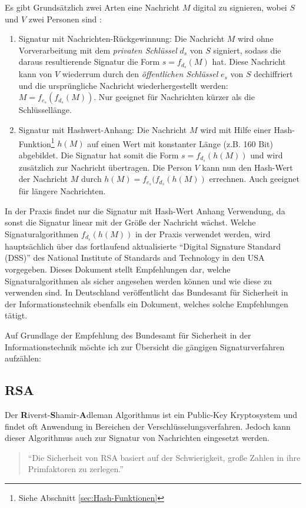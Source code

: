 \documentclass[11pt,a4paper,ngerman]{report}
\begin{document}
Es gibt Grundsätzlich zwei Arten eine Nachricht $M$ digital zu signieren, wobei $S$ und $V$ zwei Personen sind \cite[S. 28-29]{kryptSec11}:
\begin{enumerate}
    \item Signatur mit Nachrichten-Rückgewinnung: Die Nachricht $M$ wird ohne Vorverarbeitung mit dem \textit{privaten Schlüssel} $d_s$ von $S$ signiert, sodass die daraus resultierende Signatur die Form $s = f_{d_s}(M)$ hat. Diese Nachricht kann von $V$ wiederrum durch den \textit{öffentlichen Schlüssel} $e_s$ von $S$ dechiffriert und die ursprüngliche Nachricht wiederhergestellt werden: $M = f_{e_s}(f_{d_s}(M))$. Nur geeignet für Nachrichten kürzer als die Schlüssellänge.
    \item Signatur mit Hashwert-Anhang: Die Nachricht $M$ wird mit Hilfe einer Hash-Funktion\footnote{Siehe Abschnitt \ref{sec:Hash-Funktionen}} $h(M)$ auf einen Wert mit konstanter Länge (z.B. 160 Bit) abgebildet. Die Signatur hat somit die Form $s = f_{d_s}(h(M))$ und wird zusätzlich zur Nachricht übertragen. Die Person $V$ kann nun den Hash-Wert der Nachricht $M$ durch $h(M) = f_{e_s}(f_{d_s}(h(M))$ errechnen. Auch geeignet für längere Nachrichten.
\end{enumerate}
In der Praxis findet nur die Signatur mit Hash-Wert Anhang Verwendung, da sonst die Signatur linear mit der Größe der Nachricht wächst. Welche Signaturalgorithmen $f_{d_s}(h(M))$ in der Praxis verwendet werden, wird hauptsächlich über das fortlaufend aktualisierte ``Digital Signature Standard (DSS)'' des National Institute of Standards and Technology in den USA vorgegeben. Dieses Dokument stellt Empfehlungen dar, welche Signaturalgorithmen als sicher angesehen werden können und wie diese zu verwenden sind. In Deutschland veröffentlicht das Bundesamt für Sicherheit in der Informationstechnik ebenfalls ein Dokument, welches solche Empfehlungen tätigt.

Auf Grundlage der Empfehlung des Bundesamt für Sicherheit in der Informationstechnik \cite[Kapitel 5.4]{bsi-tr-02102-1} möchte ich zur Übersicht die gängigen Signaturverfahren aufzählen:
\subsection{RSA}
Der \textbf{R}iverst-\textbf{S}hamir-\textbf{A}dleman Algorithmus ist ein Public-Key Kryptosystem und findet oft Anwendung in Bereichen der Verschlüsselungsverfahren. Jedoch kann dieser Algorithmus auch zur Signatur von Nachrichten eingesetzt werden. 
\begin{quote}
    ``Die Sicherheit von RSA basiert auf der Schwierigkeit, große Zahlen in ihre Primfaktoren zu zerlegen.'' \cite[S. 82]{ertel12}
\end{quote}
\end{document}
